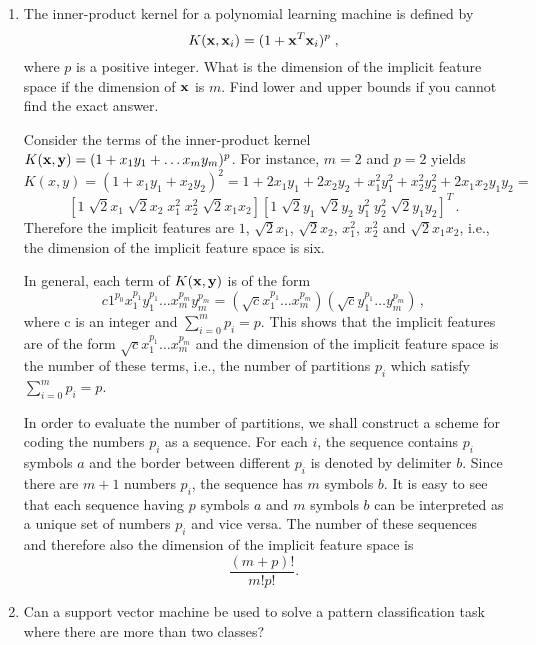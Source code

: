 \begin{enumerate}
\item The inner-product kernel for a polynomial learning machine is
  defined by
  \begin{displaymath}
    K(\mathbf{x},\mathbf{x}_i) = (1 + \mathbf{x}^T \mathbf{x}_i)^p \; ,
  \end{displaymath}
  where $p$ is a positive integer.  What is the dimension of the
  implicit feature space if the dimension of $\mathbf{x}$ is $m$.  Find lower
  and upper bounds if you cannot find the exact answer.

  \begin{solution}

    Consider the terms of the inner-product kernel $K(\mathbf{x}, \mathbf{y}) =
    (1 + x_1 y_1 + \ldots x_m y_m)^p$.  For instance, $m=2$ and $p=2$
    yields $$K(x, y) = (1 + x_1y_1 + x_2y_2)^2 = 1 + 2x_1y_1 + 2x_2y_2 +
    x_1^2y_1^2 + x_2^2y_2^2 + 2x_1x_2y_1y_2 = $$ $$[1 \; \sqrt{2}x_1 \;
    \sqrt{2}x_2 \; x_1^2 \; x_2^2 \; \sqrt{2}x_1 x_2] [1 \; \sqrt{2}y_1
    \; \sqrt{2}y_2 \; y_1^2 \; y_2^2 \; \sqrt{2}y_1 y_2]^T \, .$$
    Therefore the implicit features are $1$, $\sqrt{2}x_1$,
    $\sqrt{2}x_2$, $x_1^2$, $x_2^2$ and $\sqrt{2}x_1 x_2$, i.e., the
    dimension of the implicit feature space is six.

    In general, each term of $K(\mathbf{x}, \mathbf{y})$ is of the form $$c 1^{p_0}
    x_1^{p_1} y_1^{p_1} \ldots x_m^{p_m} y_m^{p_m} = (\sqrt{c} x_1^{p_1}
    \ldots x_m^{p_m})(\sqrt{c} y_1^{p_1} \ldots y_m^{p_m}) \, ,$$where c
    is an integer and $\sum_{i=0}^m p_i = p$.  This shows that the
    implicit features are of the form $\sqrt{c} x_1^{p_1} \ldots
    x_m^{p_m}$ and the dimension of the implicit feature space is the
    number of these terms, i.e., the number of partitions $p_i$ which
    satisfy $\sum_{i=0}^m p_i = p$.

    In order to evaluate the number of partitions, we shall construct a
    scheme for coding the numbers $p_i$ as a sequence.  For each $i$,
    the sequence contains $p_i$ symbols $a$ and the border between
    different $p_i$ is denoted by delimiter $b$.  Since there are $m+1$
    numbers $p_i$, the sequence has $m$ symbols $b$.  It is easy to see
    that each sequence having $p$ symbols $a$ and $m$ symbols $b$ can be
    interpreted as a unique set of numbers $p_i$ and vice versa.  The
    number of these sequences and therefore also the dimension of the
    implicit feature space is 
    $$\frac{(m+p)!}{m!p!}.$$
  \end{solution}
  

\item Can a support vector machine be used to solve a pattern
  classification task where there are more than two classes?


\end{enumerate}
